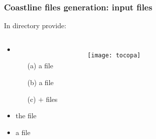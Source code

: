 

\begin{frame}[t]
\frametitle{Coastline files generation: input files}

\centerline{In  directory provide:}

\begin{columns}[totalwidth=\textwidth,T]
\vspace*{1cm}
\small{
\begin{itemize}
\item 
\begin{itemize}
\item[(a)] a  file \hfill {}
\item[(b)] a  file \hfill {}
\item[(c)]  $+$  files
\end{itemize}
\item the  file
\item a  file
\end{itemize}
}

\begin{figure}
\centering
\texttt{[image: tocopa]}
\end{figure}

\end{columns}
\end{frame}


